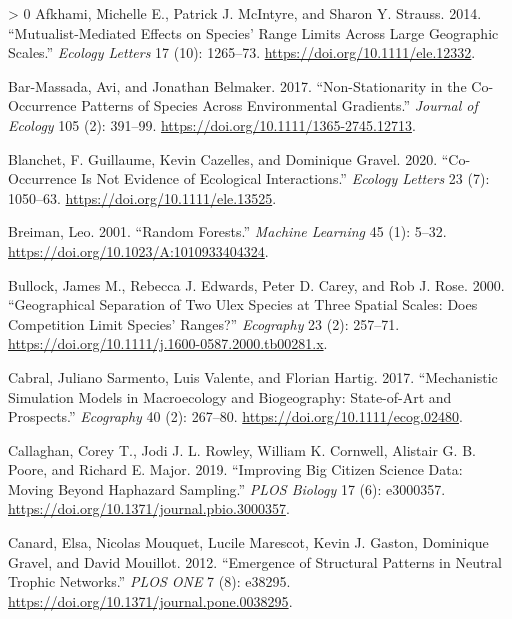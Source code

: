 \documentclass[11pt]{article}
\newlength{\cslhangindent}
\newenvironment{CSLReferences}[3] %
 {%
  \setlength{\parindent}{0pt}
  \ifodd #1 \everypar{\setlength{\hangindent}{\cslhangindent}}\ignorespaces\fi
  \ifnum #2 > 0
  \setlength{\parskip}{#2\baselineskip}
  \fi
 }%
 {}
\begin{document}
\hypertarget{refs}{}
\begin{CSLReferences}{1}{0}
\leavevmode\hypertarget{ref-Afkhami2014MutEff}{}%
Afkhami, Michelle E., Patrick J. McIntyre, and Sharon Y. Strauss. 2014.
{``Mutualist-Mediated Effects on Species' Range Limits Across Large
Geographic Scales.''} \emph{Ecology Letters} 17 (10): 1265--73.
\url{https://doi.org/10.1111/ele.12332}.

\leavevmode\hypertarget{ref-Bar-Massada2017NonCoo}{}%
Bar-Massada, Avi, and Jonathan Belmaker. 2017. {``Non-Stationarity in
the Co-Occurrence Patterns of Species Across Environmental Gradients.''}
\emph{Journal of Ecology} 105 (2): 391--99.
\url{https://doi.org/10.1111/1365-2745.12713}.

\leavevmode\hypertarget{ref-Blanchet2020CooNot}{}%
Blanchet, F. Guillaume, Kevin Cazelles, and Dominique Gravel. 2020.
{``Co-Occurrence Is Not Evidence of Ecological Interactions.''}
\emph{Ecology Letters} 23 (7): 1050--63.
\url{https://doi.org/10.1111/ele.13525}.

\leavevmode\hypertarget{ref-Breiman2001RanFor}{}%
Breiman, Leo. 2001. {``Random Forests.''} \emph{Machine Learning} 45
(1): 5--32. \url{https://doi.org/10.1023/A:1010933404324}.

\leavevmode\hypertarget{ref-Bullock2000GeoSep}{}%
Bullock, James M., Rebecca J. Edwards, Peter D. Carey, and Rob J. Rose.
2000. {``Geographical Separation of Two Ulex Species at Three Spatial
Scales: Does Competition Limit Species' Ranges?''} \emph{Ecography} 23
(2): 257--71. \url{https://doi.org/10.1111/j.1600-0587.2000.tb00281.x}.

\leavevmode\hypertarget{ref-Cabral2017MecSim}{}%
Cabral, Juliano Sarmento, Luis Valente, and Florian Hartig. 2017.
{``Mechanistic Simulation Models in Macroecology and Biogeography:
State-of-Art and Prospects.''} \emph{Ecography} 40 (2): 267--80.
\url{https://doi.org/10.1111/ecog.02480}.

\leavevmode\hypertarget{ref-Callaghan2019ImpBig}{}%
Callaghan, Corey T., Jodi J. L. Rowley, William K. Cornwell, Alistair G.
B. Poore, and Richard E. Major. 2019. {``Improving Big Citizen Science
Data: Moving Beyond Haphazard Sampling.''} \emph{PLOS Biology} 17 (6):
e3000357. \url{https://doi.org/10.1371/journal.pbio.3000357}.

\leavevmode\hypertarget{ref-Canard2012EmeStr}{}%
Canard, Elsa, Nicolas Mouquet, Lucile Marescot, Kevin J. Gaston,
Dominique Gravel, and David Mouillot. 2012. {``Emergence of Structural
Patterns in Neutral Trophic Networks.''} \emph{PLOS ONE} 7 (8): e38295.
\url{https://doi.org/10.1371/journal.pone.0038295}.


\end{CSLReferences}
\end{document}
